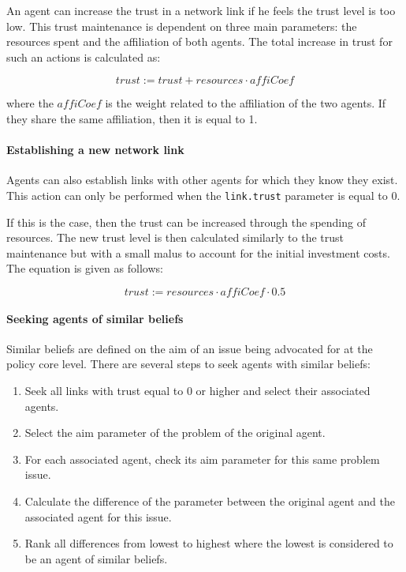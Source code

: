 An agent can increase the trust in a network link if he feels the trust level is too low. This trust maintenance is dependent on three main parameters: the resources spent and the affiliation of both agents. The total increase in trust for such an actions is calculated as:

\begin{equation}
trust := trust + resources \cdot affiCoef
\end{equation}

where the $affiCoef$ is the weight related to the affiliation of the two agents. If they share the same affiliation, then it is equal to 1.

\paragraph{Establishing a new network link}

Agents can also establish links with other agents for which they know they exist. This action can only be performed when the \texttt{link.trust} parameter is equal to 0.

If this is the case, then the trust can be increased through the spending of resources. The new trust level is then calculated similarly to the trust maintenance but with a small malus to account for the initial investment costs. The equation is given as follows:

\begin{equation}
trust := resources \cdot affiCoef \cdot 0.5
\end{equation}

\paragraph{Seeking agents of similar beliefs}

Similar beliefs are defined on the aim of an issue being advocated for at the policy core level. There are several steps to seek agents with similar beliefs:

\begin{enumerate}
\item Seek all links with trust equal to 0 or higher and select their associated agents.
\item Select the aim parameter of the problem of the original agent.
\item For each associated agent, check its aim parameter for this same problem issue.
\item Calculate the difference of the parameter between the original agent and the associated agent for this issue.
\item Rank all differences from lowest to highest where the lowest is considered to be an agent of similar beliefs.
\end{enumerate}

